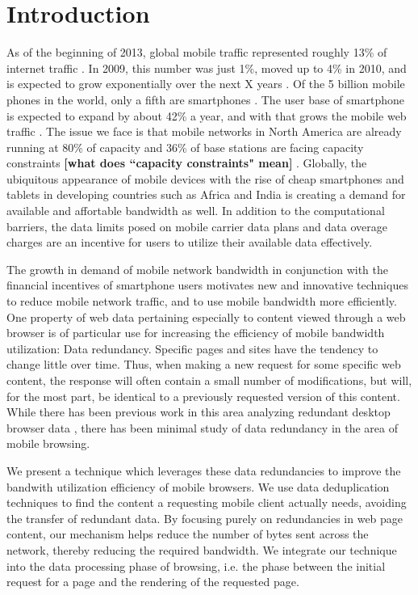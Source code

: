 \section{Introduction}
As of the beginning of 2013, global mobile traffic represented roughly 13\% of internet traffic \cite{?}. In 2009, this number was just 1\%, moved up 
to 4\% in 2010, and is expected to grow exponentially over the next X years \cite{?}. Of the 5 billion mobile phones in the world, only a fifth are 
smartphones \cite{?}. The user base of smartphone is expected to expand by about 42\% a year, and with that grows the mobile web traffic \cite{?}. The 
issue we face is that mobile networks in North America are already running at 80\% of capacity and 36\% of base stations are facing capacity constraints 
\textbf{[what does ``capacity constraints" mean]} \cite{?}. Globally, the ubiquitous appearance of mobile devices with the rise of cheap smartphones and 
tablets in developing countries such as Africa and India is creating a demand for available and affortable bandwidth as well. In addition to the computational 
barriers, the data limits posed on mobile carrier data plans and data overage charges are an incentive for users to utilize their available data effectively. 

The growth in demand of mobile network bandwidth in conjunction with the financial incentives of smartphone users motivates new and innovative techniques 
to reduce mobile network traffic, and to use mobile bandwidth more efficiently. One property of web data pertaining especially to content viewed through a 
web browser is of particular use for increasing the efficiency of mobile bandwidth utilization: Data redundancy. Specific pages and sites have the tendency 
to change little over time. Thus, when making a new request for some specific web content, the response will often contain a small number of modifications, 
but will, for the most part, be identical to a previously requested version of this content. While there has been previous work in this area analyzing redundant 
desktop browser data \cite{?}, there has been minimal study of data redundancy in the area of mobile browsing.


We present a technique which leverages these data redundancies to improve the bandwith utilization efficiency of mobile browsers. We use data deduplication 
techniques to find the content a requesting mobile client actually needs, avoiding the transfer of redundant data. By focusing purely on redundancies in web 
page content, our mechanism helps reduce the number of bytes sent across the network, thereby reducing the required bandwidth. We integrate our technique into 
the data processing phase of browsing, i.e. the phase between the initial request for a page and the rendering of the requested page. 

